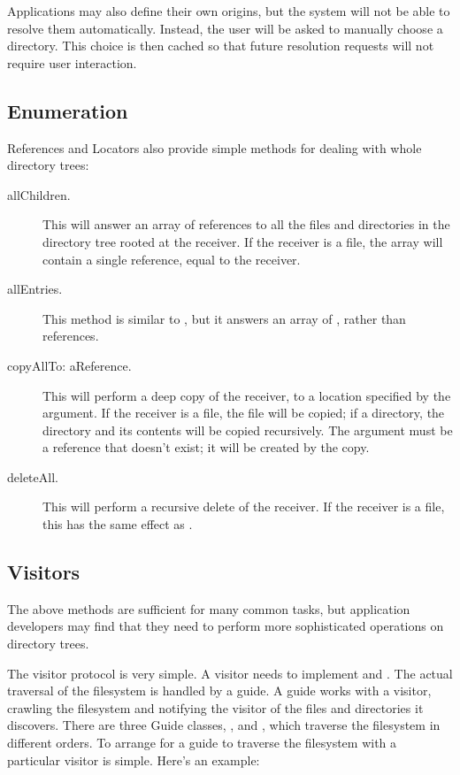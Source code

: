 \documentclass[a4paper,10pt,twoside]{book}
\begin{document}
Applications may also define their own origins, but the system will not be able to resolve them automatically. Instead, the user will be asked to manually choose a directory. This choice is then cached so that future resolution requests will not require user interaction.

\subsection{Enumeration}

References and Locators also provide simple methods for dealing with whole directory trees:

\begin{description}
\item[allChildren.]

This will answer an array of references to all the files and directories in the directory tree rooted at the receiver. If the receiver is a file, the array will contain a single reference, equal to the receiver.

\item[allEntries.]
This method is similar to , but it answers an array of , rather than references.

\item[copyAllTo: aReference.]

This will perform a deep copy of the receiver, to a location specified by the argument. If the receiver is a file, the file will be copied; if a directory, the directory and its contents will be copied recursively. The argument must be a reference that doesn't exist; it will be created by the copy.

\item[deleteAll.]

This will perform a recursive delete of the receiver. If the receiver is a file, this has the same effect as .
\end{description}

\subsection{Visitors}

The above methods are sufficient for many common tasks, but application developers may find that they need to perform more sophisticated operations on directory trees.

The visitor protocol is very simple. A visitor needs to implement  and . The actual traversal of the filesystem is handled by a guide. A guide works with a visitor, crawling the filesystem and notifying the visitor of the files and directories it discovers. There are three Guide classes, ,  and  , which traverse the filesystem in different orders. To arrange for a guide to traverse the filesystem with a particular visitor is simple. Here's an example:
\end{document}
